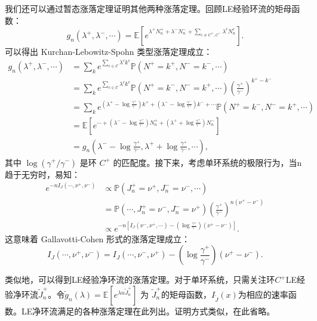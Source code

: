 我们还可以通过暂态涨落定理证明其他两种涨落定理。回顾LE经验环流的矩母函数：
\begin{equation*}
    g_n(\lambda^+,\lambda^-,\cdots)
    = \mathbb{E}\left[e^{\lambda^+N^+_n+\lambda^-N^-_n+\sum_{c\neq C^+,C^-}\lambda^cN^c_n}\right].
\end{equation*}
可以得出 Kurchan-Lebowitz-Spohn 类型涨落定理成立：
\begin{align*}
    g_n(\lambda^+,\lambda^-,\cdots)
    &= \sum_{k}e^{\sum_{c\in\mathcal{C}}\lambda^ck^c}\mathbb{P}\left(N^+=k^+,N^-=k^-,\cdots\right)\\
    &= \sum_{k}e^{\sum_{c\in\mathcal{C}}\lambda^ck^c}
    \mathbb{P}\left(N^+=k^-,N^-=k^+,\cdots\right) \left(\frac{\gamma^+}{\gamma^-}\right)^{k^+-k^-}\\
    &= \sum_{k}e^{\left(\lambda^+-\log\frac{\gamma^+}{\gamma^-}\right)k^++
    \left(\lambda^--\log\frac{\gamma^-}{\gamma^+}\right)k^-+\cdots}\mathbb{P}(N^+=k^-,N^-=k^+,\cdots)\\
    &= \mathbb{E}\left[e^{\cdots+\left(\lambda^--\log\frac{\gamma^+}{\gamma^-}\right)N^+_n+
    \left(\lambda^++\log\frac{\gamma^+}{\gamma^-}\right)N^-_n}\right]\\
    &= g_n\left(\lambda^--\log\frac{\gamma^+}{\gamma^-},
    \lambda^++\log\frac{\gamma^+}{\gamma^-},\cdots\right),
\end{align*}
其中 $\log(\gamma^+/\gamma^-)$ 是环 $C^+$ 的匹配度。接下来，考虑单环系统的极限行为，当n趋于无穷时，易知：
\begin{align*}
e^{-nI_J(\cdots,\nu^+,\nu^-)}
&\propto \mathbb{P}\left(J^+_n=\nu^+, J^-_n=\nu^-, \cdots\right)\\
&= \mathbb{P}\left(\cdots,J^+_n=\nu^-, J^-_n=\nu^+\right)
\left(\frac{\gamma^+}{\gamma^-}\right)^{n(\nu^+-\nu^-)}\\
&\propto e^{-n\left[I_J(\nu^-,\nu^+,\cdots)-\left(\log\frac{\gamma^+}{\gamma^-}\right)
(\nu^+-\nu^-)\right]}.
\end{align*}
这意味着 Gallavotti-Cohen 形式的涨落定理成立：
\begin{equation}\label{G-C type fluctuation}
    I_J(\cdots,\nu^+,\nu^-)=I_J(\cdots,\nu^-,\nu^+)-\left(\log\frac{\gamma^+}{\gamma^-}\right)(\nu^+-\nu^-).
\end{equation}

类似地，可以得到LE经验净环流的涨落定理。对于单环系统，只需关注环$C^+$LE经验净环流$\tilde{J}_n^+$。令$\tilde{g}_n(\lambda) = \mathbb{E}[e^{\lambda n\tilde{J}^+_n}]$ 为 $\tilde{J}^+_n$的矩母函数，$I_{\tilde{J}}(x)$为相应的速率函数。LE净环流满足的各种涨落定理在此列出。证明方式类似，在此省略。

